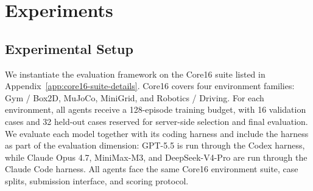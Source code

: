 \section{Experiments}
\label{sec:experiments}




\subsection{Experimental Setup}
\label{sec:experimental-setup}


We instantiate the evaluation framework on the Core16 suite listed in
Appendix~\ref{app:core16-suite-details}. Core16 covers four environment families: Gym / Box2D, MuJoCo, MiniGrid, and Robotics / Driving. For each environment, all agents receive a 128-episode training budget, with 16 validation cases and 32 held-out cases reserved for server-side selection and final evaluation. We evaluate each model together with its coding harness and include the harness as part of the evaluation dimension: GPT-5.5 is run through the Codex harness, while Claude Opus 4.7, MiniMax-M3, and DeepSeek-V4-Pro are run through the Claude Code harness. All agents face the same Core16 environment suite, case splits, submission interface, and scoring protocol. 

